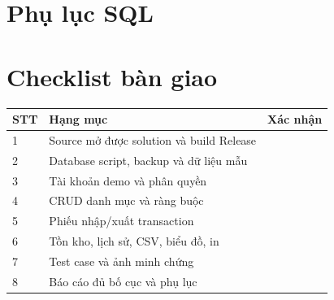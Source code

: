 \documentclass[12pt,a4paper]{report}
\begin{document}
\chapter{Phụ lục SQL}



\chapter{Checklist bàn giao}
\begin{longtable}{p{}p{}p{}}
\toprule STT & Hạng mục & Xác nhận\\\midrule
1 & Source mở được solution và build Release & \\
2 & Database script, backup và dữ liệu mẫu & \\
3 & Tài khoản demo và phân quyền & \\
4 & CRUD danh mục và ràng buộc & \\
5 & Phiếu nhập/xuất transaction & \\
6 & Tồn kho, lịch sử, CSV, biểu đồ, in & \\
7 & Test case và ảnh minh chứng & \\
8 & Báo cáo đủ bố cục và phụ lục & \\
\bottomrule
\end{longtable}
\end{document}

